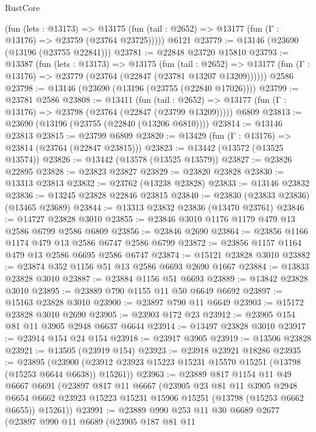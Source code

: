 \begin{lexlean}{RustCore}
\begin{coremodule}
      (fun (lets : @13173) =>
      @13175 (fun (tail : @2652) => @13177 (fun (Γ : @13176) => @23759 (@23764 @23725)))))
    @6121
@23779 := @13146 (@23690 (@13196 (@23755 @22841)))
@23781 := @22848 @23720 @15810
@23793 := @13387
    (fun (lets : @13173) =>
    @13175
      (fun (tail : @2652) =>
      @13177 (fun (Γ : @13176) => @23779 (@23764 (@22847 (@23781 @13207 @13209))))))
    @2586
@23798 := @13146 (@23690 (@13196 (@23755 (@22840 @17026))))
@23799 := @23781 @2586
@23808 := @13411
    (fun (tail : @2652) => @13177 (fun (Γ : @13176) => @23798 (@23764 (@22847 (@23799 @13209)))))
    @6809
@23813 := @23690 (@13196 (@23755 (@22840 (@13206 @6810))))
@23814 := @13146 @23813
@23815 := @23799 @6809
@23820 := @13429 (fun (Γ : @13176) => @23814 (@23764 (@22847 @23815)))
@23823 := @13442 (@13572 (@13525 @13574))
@23826 := @13442 (@13578 (@13525 @13579))
@23827 := @23826 @22895
@23828 := @23823 @23827
@23829 := @23820 @23828
@23830 := @13313 @23813
@23832 := @23762 (@13238 @23828)
@23833 := @13146 @23832
@23836 := @13245 @23828 @22846 @23815
@23840 := @23830 (@23833 @23836) (@13465 @23689)
@23844 := @13313 @23832 @23836 (@13470 @23761)
@23846 := @14727 @23828 @3010
@23855 := @23846 @3010 @1176 @1179 @479 @13 @2586 @6799 @2586 @6809
@23856 := @23846 @2690
@23864 := @23856 @1166 @1174 @479 @13 @2586 @6747 @2586 @6799
@23872 := @23856 @1157 @1164 @479 @13 @2586 @6695 @2586 @6747
@23874 := @15121 @23828 @3010
@23882 := @23874 @352 @1156 @51 @13 @2586 @6693 @2690 @1667
@23884 := @13833 @23828 @3010
@23887 := @23884 @1156 @51 @6693
@23889 := @13842 @23828 @3010
@23895 := @23889 @790 @1155 @11 @50 @6649 @6692
@23897 := @15163 @23828 @3010
@23900 := @23897 @790 @11 @6649
@23903 := @15172 @23828 @3010 @2690
@23905 := @23903 @172 @23
@23912 := @23905 @154 @81 @11 @3905 @2948 @6637 @6644
@23914 := @13497 @23828 @3010
@23917 := @23914 @154 @24 @154
@23918 := @23917 @3905
@23919 := @13506 @23828
@23921 := @13505 (@23919 @154)
@23923 := @23918 @23921 @18286
@23935 := @23895
    (@23900 (@23912 @23923 @15223 @15231 @15570 @15251 (@13798 (@15253 @6644 @6638)) @15261))
@23963 := @23889
    @817
    @1154
    @11
    @49
    @6667
    @6691
    (@23897
      @817
      @11
      @6667
      (@23905
        @23
        @81
        @11
        @3905
        @2948
        @6654
        @6662
        @23923
        @15223
        @15231
        @15906
        @15251
        (@13798 (@15253 @6662 @6655))
        @15261))
@23991 := @23889
    @990
    @253
    @11
    @30
    @6689
    @2677
    (@23897
      @990
      @11
      @6689
      (@23905
        @187
        @81
        @11

\end{coremodule}
\end{lexlean}
